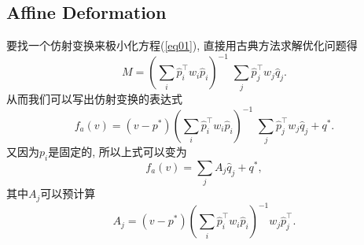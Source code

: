 \documentclass[12pt]{article}
\begin{document}
\subsection{Affine Deformation}
要找一个仿射变换来极小化方程(\ref{eq01}), 直接用古典方法求解优化问题得
\begin{equation*}
	M = \left(\sum_i\hat{p}_i^{\top}w_i\hat{p}_i\right)^{-1}\;\sum_j\hat{p}_j^{\top}w_j\hat{q}_j.
\end{equation*}
从而我们可以写出仿射变换的表达式
\begin{equation}
	f_a(v) = (v-p^*)\left(\sum_i\hat{p}_i^{\top}w_i\hat{p}_i\right)^{-1}\;\sum_j\hat{p}_j^{\top}w_j\hat{q}_j+q^*.
\end{equation}
又因为$p_i$是固定的, 所以上式可以变为
\begin{equation*}
	f_a(v) = \sum_jA_j\hat{q}_j + q^*,
\end{equation*}
其中$A_j$可以预计算
\begin{equation*}
	A_j = (v-p^*)\left(\sum_i\hat{p}_i^{\top}w_i\hat{p}_i\right)^{-1}w_j\hat{p}_j^{\top}.
\end{equation*}
\end{document}
